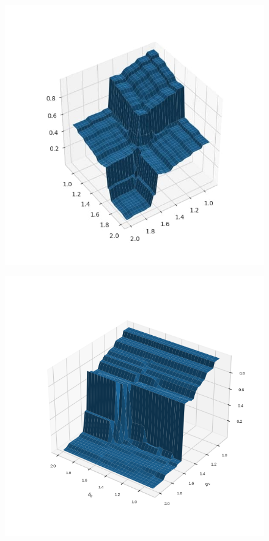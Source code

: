 \documentclass[12pt]{article}
\begin{document}
        \begin{figure}[H]
            \centering
            \begin{minipage}{.45\linewidth}
            \includegraphics[width=0.95\columnwidth, keepaspectratio=True]{DoubleField/3d.jpg}
            \label{fig:3d}
            \end{minipage}
            \hspace{.05\linewidth}
            \begin{minipage}{.45\linewidth}
            \includegraphics[width=0.95\columnwidth, keepaspectratio=True]{DoubleField/3df1.png}
            \label{fig:3df1}
            \end{minipage}
        \end{figure}
\end{document}
